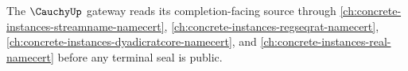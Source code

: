 The $\CauchyUp$ gateway reads its completion-facing source through \autoref{ch:concrete-instances-streamname-namecert}, \autoref{ch:concrete-instances-regseqrat-namecert}, \autoref{ch:concrete-instances-dyadicratcore-namecert}, and \autoref{ch:concrete-instances-real-namecert} before any terminal seal is public.
